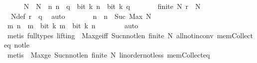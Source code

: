 \begin{isabellebody}
\ \ \ \ \isamarkupfalse%
\ N\ \ {\isacartoucheopen}N\ {\isacharequal}{\kern0pt}\ {\isacharbraceleft}{\kern0pt}n{\isachardot}{\kern0pt}\ n\ {\isacharless}{\kern0pt}\ q\ {\isasymand}\ bit\ k\ n\ {\isasymnoteq}\ bit\ k\ q{\isacharbraceright}{\kern0pt}{\isacartoucheclose}\isanewline
\ \ \ \ \isamarkupfalse%
\ \isamarkupfalse%
\ {\isacartoucheopen}finite\ N{\isacartoucheclose}\ {\isacartoucheopen}r\ {\isasymin}\ N{\isacartoucheclose}\isanewline
\ \ \ \ \ \ \isamarkupfalse%
\ {\isacharasterisk}{\kern0pt}{\isacharasterisk}{\kern0pt}\ N{\isacharunderscore}{\kern0pt}def\ {\isacartoucheopen}r\ {\isacharless}{\kern0pt}\ q{\isacartoucheclose}\ \isamarkupfalse%
\ auto\isanewline
\ \ \ \ \isamarkupfalse%
\ \isamarkupfalse%
\ n\ \ {\isacartoucheopen}n\ {\isacharequal}{\kern0pt}\ Suc\ {\isacharparenleft}{\kern0pt}Max\ N{\isacharparenright}{\kern0pt}{\isacartoucheclose}\isanewline
\ \ \ \ \isamarkupfalse%
\ \isamarkupfalse%
\ {\isacartoucheopen}{\isasymAnd}m{\isachardot}{\kern0pt}\ n\ {\isasymle}\ m\ {\isasymLongrightarrow}\ bit\ k\ m\ {\isasymlongleftrightarrow}\ bit\ k\ n{\isacartoucheclose}\isanewline
\ \ \ \ \ \ \isamarkupfalse%
\ auto\isanewline
\ \ \ \ \ \ \ \ \ \isamarkupfalse%
\ {\isacharparenleft}{\kern0pt}metis\ {\isacharparenleft}{\kern0pt}full{\isacharunderscore}{\kern0pt}types{\isacharcomma}{\kern0pt}\ lifting{\isacharparenright}{\kern0pt}\ {\isachardoublequoteopen}{\isacharasterisk}{\kern0pt}{\isachardoublequoteclose}\ Max{\isacharunderscore}{\kern0pt}ge{\isacharunderscore}{\kern0pt}iff\ Suc{\isacharunderscore}{\kern0pt}n{\isacharunderscore}{\kern0pt}not{\isacharunderscore}{\kern0pt}le{\isacharunderscore}{\kern0pt}n\ {\isacartoucheopen}finite\ N{\isacartoucheclose}\ all{\isacharunderscore}{\kern0pt}not{\isacharunderscore}{\kern0pt}in{\isacharunderscore}{\kern0pt}conv\ mem{\isacharunderscore}{\kern0pt}Collect{\isacharunderscore}{\kern0pt}eq\ not{\isacharunderscore}{\kern0pt}le{\isacharparenright}{\kern0pt}\isanewline
\ \ \ \ \ \ \ \ \isamarkupfalse%
\ {\isacharparenleft}{\kern0pt}metis\ {\isachardoublequoteopen}{\isacharasterisk}{\kern0pt}{\isachardoublequoteclose}\ Max{\isacharunderscore}{\kern0pt}ge\ Suc{\isacharunderscore}{\kern0pt}n{\isacharunderscore}{\kern0pt}not{\isacharunderscore}{\kern0pt}le{\isacharunderscore}{\kern0pt}n\ {\isacartoucheopen}finite\ N{\isacartoucheclose}\ linorder{\isacharunderscore}{\kern0pt}not{\isacharunderscore}{\kern0pt}less\ mem{\isacharunderscore}{\kern0pt}Collect{\isacharunderscore}{\kern0pt}eq{\isacharparenright}{\kern0pt}\isanewline

\end{isabellebody}
